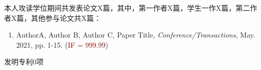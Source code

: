 \begin{publication}
\newcommand{\IF}[1]{\textcolor{Maroon}{IF = #1}}
本人攻读学位期间共发表论文X篇，其中，第一作者X篇，学生一作X篇，第二作者X篇，其他参与论文共X篇：
\begin{enumerate}
\item AuthorA, Author B, Author C, Paper Title, \emph{Conference/Transactions}, May. 2021, pp. 1-15. (\IF{999.99})
\end{enumerate}

发明专利0项


\end{publication}
